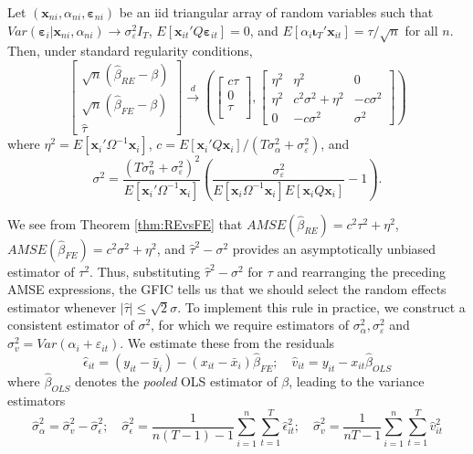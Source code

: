 \begin{thm}
\label{thm:REvsFE}
  Let $\left( \mathbf{x}_{ni}, \alpha_{ni}, \boldsymbol{\varepsilon}_{ni} \right)$ be an iid triangular array of random variables such that $Var(\boldsymbol{\varepsilon}_i|\mathbf{x}_{ni},\alpha_{ni})\rightarrow \sigma_{\varepsilon}^2 I_T$, $E[\mathbf{x}_{it}'Q\boldsymbol{\varepsilon}_{it}]=0$, and $E\left[ \alpha_i \boldsymbol{\iota}_T'\mathbf{x}_{it} \right]=\tau/\sqrt{n}$ for all $n$.
  Then, under standard regularity conditions,
\[
  \left[\begin{array}{c}
\sqrt{n} (\widehat{\beta}_{RE} - \beta)\\
\sqrt{n} (\widehat{\beta}_{FE} - \beta)\\
\widehat{\tau}
\end{array}\right] \overset{d}{\rightarrow}  \left( 
\left[\begin{array}{c}
c\tau \\
0  \\
\tau\\
\end{array}\right],  
\left[\begin{array}{ccc}
\eta^2 & \eta^2 & 0 \\
\eta^2 & c^2\sigma^2 + \eta^2 & -c\sigma^2\\ 
0 & -c\sigma^2 & \sigma^2
\end{array}\right] \right)
\]
where $\eta^2 = E[\mathbf{x}_i'\Omega^{-1}\mathbf{x}_i]$, $c = E[\mathbf{x}_i' Q \mathbf{x}_i]/(T\sigma_\alpha^2 + \sigma_\varepsilon^2)$, and
\[\sigma^2 = \frac{(T\sigma_{\alpha}^2 + \sigma_{\varepsilon}^2)^2}{E\left[ \mathbf{x}_i'\Omega^{-1}\mathbf{x}_i \right]}\left( \frac{\sigma_{\varepsilon}^2}{E\left[ \mathbf{x}_i \Omega^{-1} \mathbf{x}_i \right]E\left[ \mathbf{x}_i Q \mathbf{x}_i \right]} - 1 \right). \]
\end{thm}



We see from Theorem \ref{thm:REvsFE} that $AMSE(\widehat{\beta}_{RE}) = c^2 \tau^2 + \eta^2$, $AMSE(\widehat{\beta}_{FE}) = c^2\sigma^2 + \eta^2$, and $\widehat{\tau}^2 - \sigma^2$ provides an asymptotically unbiased estimator of $\tau^2$.
Thus, substituting $\widehat{\tau}^2 - \sigma^2$ for $\tau$ and rearranging the preceding AMSE expressions, the GFIC tells us that we should select the random effects estimator whenever $|\widehat{\tau}|\leq \sqrt{2} \sigma$.
To implement this rule in practice, we construct a consistent estimator of $\sigma^2$, for which we require estimators of $\sigma_{\alpha}^2, \sigma_{\varepsilon}^2$ and $\sigma_{v}^2 = Var(\alpha_i + \varepsilon_{it})$.
We estimate these from the residuals
\[
\widehat{\epsilon}_{it} = (y_{it} -\bar{y}_i) - (x_{it} - \bar{x}_i) \widehat{\beta}_{FE}; \quad
\widehat{v}_{it} = y_{it} - x_{it} \widehat{\beta}_{OLS}
\]
where $\widehat{\beta}_{OLS}$ denotes the \emph{pooled} OLS estimator of $\beta$, leading to the variance estimators 
\[
\widehat{\sigma}_\alpha^2 = \widehat{\sigma}_v^2 - \widehat{\sigma}_\epsilon^2; \quad
\widehat{\sigma}_\epsilon^2 = \frac{1}{n(T-1)-1} \sum_{i=1}^n \sum_{t=1}^T \widehat{\epsilon}_{it}^2; \quad
\widehat{\sigma}_v^2 = \frac{1}{nT-1} \sum_{i=1}^n \sum_{t=1}^T \widehat{v}_{it}^2
\]

